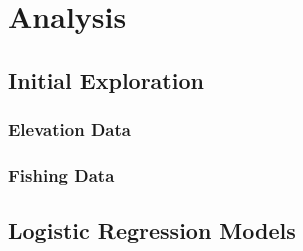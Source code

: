\section{Analysis}

\subsection{Initial Exploration}

\subsubsection{Elevation Data}


\subsubsection{Fishing Data}



\subsection{Logistic Regression Models}

